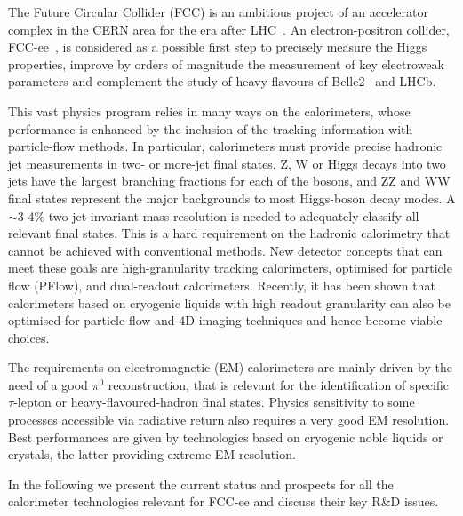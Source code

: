 The Future Circular Collider (FCC) is an ambitious project of an accelerator complex in the CERN area for the era after LHC~\cite{Benedikt:2653673}.  An electron-positron collider, FCC-ee~\cite{Benedikt:2651299}, is considered as a possible first step to precisely measure the Higgs properties, improve by orders of magnitude the measurement of key electroweak parameters and complement the study of heavy flavours of Belle2~\cite{Kou:2018nap} and LHCb\cite{Alves:2008zz,Bediaga:2018lhg}. 

This vast physics program relies in many ways on the calorimeters, whose performance is enhanced by the inclusion of the tracking information with particle-flow methods.  In particular, calorimeters must provide precise hadronic jet measurements in two- or more-jet final states.  Z, W or Higgs decays into two jets have the largest branching fractions for each of the bosons, and ZZ and WW final states represent the major backgrounds to most Higgs-boson decay modes.  A $\sim$3-4\% two-jet invariant-mass resolution is needed to adequately classify all relevant final states. This is a hard requirement on the hadronic calorimetry that cannot be achieved with conventional methods.  New detector concepts that can meet these goals are high-granularity tracking calorimeters, optimised for particle flow (PFlow), and dual-readout calorimeters.  Recently, it has been shown that calorimeters based on cryogenic liquids with high readout granularity can also be optimised for particle-flow and 4D imaging techniques and hence become viable choices.  


The requirements on electromagnetic (EM) calorimeters are mainly driven by the need of a good $\pi^0$ reconstruction, that is relevant for the identification of specific $\tau$-lepton or heavy-flavoured-hadron final states. Physics sensitivity to some processes accessible via radiative return also requires a very good EM resolution.  Best performances are given by technologies based on cryogenic noble liquids or crystals, the latter providing extreme EM resolution.

In the following we present the current status and prospects for all the calorimeter technologies relevant for FCC-ee and discuss their key R\&D issues. 


